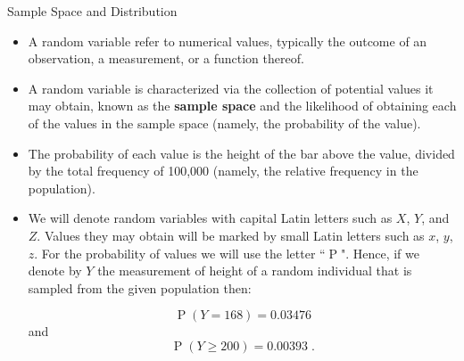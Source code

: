 \documentclass[10pt,handout]{beamer}\usepackage[]{graphicx}\usepackage[]{color}
\newcommand{\Prob}{\operatorname{P}}
\begin{document}
\begin{frame}[fragile]{Sample Space and Distribution}
	\small
	\begin{itemize}[<+->]
		
		\item A random variable refer to numerical values, typically the outcome of an
		observation, a measurement, or a function thereof.
		
		\item A random variable is characterized via the collection of potential
		values it may obtain, known as the \textbf{sample space} and the likelihood of
		obtaining each of the values in the sample space (namely, the
		probability of the value).
		
		\item The probability of each value is the height
		of the bar above the value, divided by the total frequency of 100,000
		(namely, the relative frequency in the population).
		
		\item We will denote random variables with capital Latin letters such as $X$,
		$Y$, and $Z$. Values they may obtain will be marked by small Latin
		letters such as $x$, $y$, $z$. For the probability of values we will use
		the letter “$\Prob$". Hence, if we denote by $Y$ the measurement of
		height of a random individual that is sampled from the given population
		then: 
		
		$$\Prob(Y = 168) = 0.03476$$ and 
		$$\Prob(Y \geq 200) = 0.00393\;.$$
		
	\end{itemize}
	
\end{frame}
\end{document}
